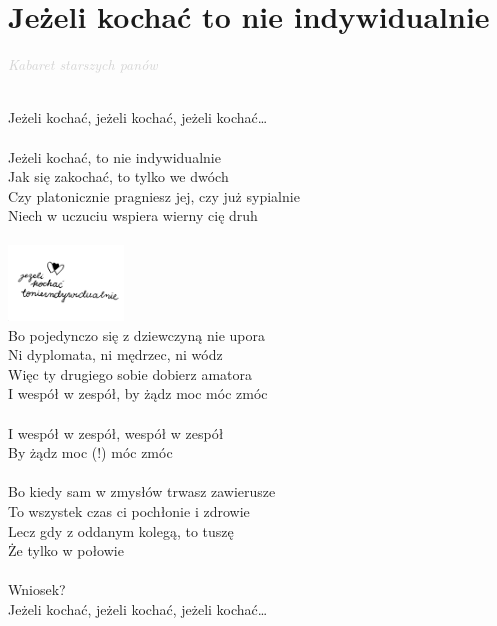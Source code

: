 \documentclass[a5paper, 10pt]{book}
\begin{document}
\newpage
\section{Jeżeli kochać to nie indywidualnie}\textcolor{lightgray}{\textit{Kabaret starszych panów}}\\~\\
\begin{minipage}[t]{0.8\textwidth}
\hspace*{4mm}Jeżeli kochać, jeżeli kochać, jeżeli kochać…\\
\\
Jeżeli kochać, to nie indywidualnie\\
Jak się zakochać, to tylko we dwóch\\
Czy platonicznie pragniesz jej, czy już sypialnie\\
Niech w uczuciu wspiera wierny cię druh\\
\\
\includegraphics[height=2cm, right]{images/jezeli_kochac.png}\vspace*{-20.5mm}\\
Bo pojedynczo się z dziewczyną nie upora\\
Ni dyplomata, ni mędrzec, ni wódz\\
Więc ty drugiego sobie dobierz amatora\\
I wespół w zespół, by żądz moc móc zmóc\\
\\
\hspace*{8mm}I wespół w zespół, wespół w zespół\\
\hspace*{8mm}By żądz moc (!) móc zmóc\\
\\
Bo kiedy sam w zmysłów trwasz zawierusze\\
To wszystek czas ci pochłonie i zdrowie\\
Lecz gdy z oddanym kolegą, to tuszę\\
Że tylko w połowie\\
\\
\hspace*{4mm}Wniosek?\\
\hspace*{4mm}Jeżeli kochać, jeżeli kochać, jeżeli kochać…\\

\end{minipage}
\end{document}
